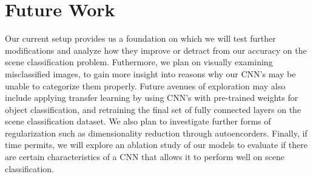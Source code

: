 \documentclass[10pt,twocolumn,letterpaper]{article}
\begin{document}
\section{Future Work}

Our current setup provides us a foundation on which we will test further
modifications and analyze how they improve or detract from our accuracy on the
scene classification problem. Futhermore, we plan on visually examining
misclassified images, to gain more insight into reasons why our CNN's may be
unable to categorize them properly. Future avenues of exploration may also
include applying transfer learning by using CNN's with pre-trained weights for
object classification, and retraining the final set of fully connected layers
on the scene classification dataset. We also plan to investigate further forms of regularization such as dimensionality reduction through autoencorders.
Finally, if time permits, we will explore an ablation study of our models to evaluate if there are certain characteristics of a CNN that allows it to perform well on scene classification.\\


\nocite{Lin}
\nocite{Wu}


{\small


}
\end{document}

